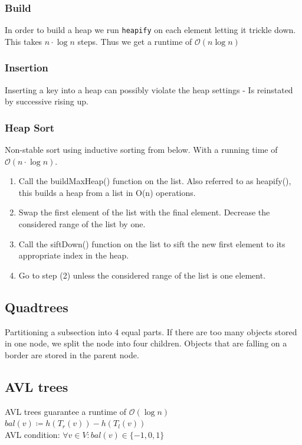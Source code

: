 \documentclass[9pt,landscape,a4paper, table]{extarticle}
\begin{document}
\begin{multicols*}{3}
\subsubsection{Build}
In order to build a heap we run \texttt{heapify} on each element letting it trickle down. This takes $n\cdot \log n$ steps. Thus we get a runtime of $\mathcal{O}(n \log n)$ 
\subsubsection{Insertion}
Inserting a key into a heap can possibly violate the heap settings - Is reinstated by successive rising up. 
\subsubsection{Heap Sort}
Non-stable sort using inductive sorting from below. With a running time of $\mathcal{O}(n\cdot \log n)$.

\begin{enumerate}
    \item Call the buildMaxHeap() function on the list. Also referred to as heapify(), this builds a heap from a list in O(n) operations.
\item Swap the first element of the list with the final element. Decrease the considered range of the list by one.
\item Call the siftDown() function on the list to sift the new first element to its appropriate index in the heap.
\item Go to step (2) unless the considered range of the list is one element.
\end{enumerate}

\subsection{Quadtrees}
Partitioning a subsection into 4 equal parts. If there are too many objects stored in one node, we split the node into four children. Objects that are falling on a border are stored in the parent node.

\subsection{AVL trees}
AVL trees guarantee a runtime of $\mathcal{O}(\log n)$\\
$bal (v) \coloneqq h(T_r(v))-h(T_l(v))$\\
AVL condition: $\forall v \in V: bal(v) \in \{-1,0,1\}$


\end{multicols*}
\end{document}
